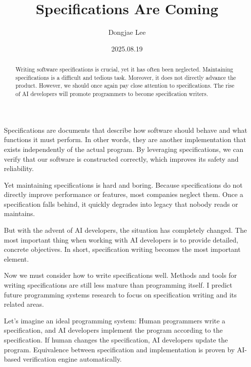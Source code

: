 \documentclass[11pt, oneside]{article}   	%
\title{Specifications Are Coming}
\author{Dongjae Lee}
\date{2025.08.19}
\begin{document}
\maketitle


\begin{abstract}
	Writing software specifications is crucial, yet it has often been neglected.
	Maintaining specifications is a difficult and tedious task.
	Moreover, it does not directly advance the product.
	However, we should once again pay close attention to specifications.
	The rise of AI developers will promote programmers to become specification writers.
\end{abstract}

Specifications are documents that describe how software should behave and what functions it must perform.
In other words, they are another implementation that exists independently of the actual program.
By leveraging specifications, we can verify that our software is constructed correctly, which improves its safety and reliability.

Yet maintaining specifications is hard and boring.
Because specifications do not directly improve performance or features, most companies neglect them.
Once a specification falls behind, it quickly degrades into legacy that nobody reads or maintains.

But with the advent of AI developers, the situation has completely changed.
The most important thing when working with AI developers is to provide detailed, concrete objectives.
In short, specification writing becomes the most important element.

Now we must consider how to write specifications well.
Methods and tools for writing specifications are still less mature than programming itself.
I predict future programming systems research to focus on specification writing and its related areas.

Let's imagine an ideal programming system:
Human programmers write a specification, and AI developers implement the program according to the specification.
If human changes the specification, AI developers update the program.
Equivalence between specification and implementation is proven by AI-based verification engine automatically.
\end{document}
